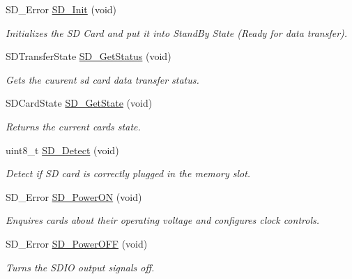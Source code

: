 \begin{DoxyCompactItemize}
\item 
S\+D\+\_\+\+Error \hyperlink{group___s_t_m324x_g___e_v_a_l___s_d_i_o___s_d___exported___functions_ga3c927d4d98ffb6f3cc2442b09c19926c}{S\+D\+\_\+\+Init} (void)
\begin{DoxyCompactList}\small\item\em Initializes the SD Card and put it into Stand\+By State (Ready for data transfer). \end{DoxyCompactList}\item 
S\+D\+Transfer\+State \hyperlink{group___s_t_m324x_g___e_v_a_l___s_d_i_o___s_d___exported___functions_gaf3f228aaee7b2b18acc056b2f27ca3f7}{S\+D\+\_\+\+Get\+Status} (void)
\begin{DoxyCompactList}\small\item\em Gets the cuurent sd card data transfer status. \end{DoxyCompactList}\item 
S\+D\+Card\+State \hyperlink{group___s_t_m324x_g___e_v_a_l___s_d_i_o___s_d___exported___functions_ga1c49d266e4f9ba33b7a425361a30d227}{S\+D\+\_\+\+Get\+State} (void)
\begin{DoxyCompactList}\small\item\em Returns the current card\textquotesingle{}s state. \end{DoxyCompactList}\item 
uint8\+\_\+t \hyperlink{group___s_t_m324x_g___e_v_a_l___s_d_i_o___s_d___exported___functions_gacb7415873dffa26068c5e46025efebfa}{S\+D\+\_\+\+Detect} (void)
\begin{DoxyCompactList}\small\item\em Detect if SD card is correctly plugged in the memory slot. \end{DoxyCompactList}\item 
S\+D\+\_\+\+Error \hyperlink{group___s_t_m324x_g___e_v_a_l___s_d_i_o___s_d___exported___functions_ga9fbd4dd6187701cbe286ddb163e9c312}{S\+D\+\_\+\+Power\+ON} (void)
\begin{DoxyCompactList}\small\item\em Enquires cards about their operating voltage and configures clock controls. \end{DoxyCompactList}\item 
S\+D\+\_\+\+Error \hyperlink{group___s_t_m324x_g___e_v_a_l___s_d_i_o___s_d___exported___functions_ga9f053c27018521095d7333e7df238764}{S\+D\+\_\+\+Power\+O\+FF} (void)
\begin{DoxyCompactList}\small\item\em Turns the S\+D\+IO output signals off. \end{DoxyCompactList}\item 

\end{DoxyCompactItemize}
